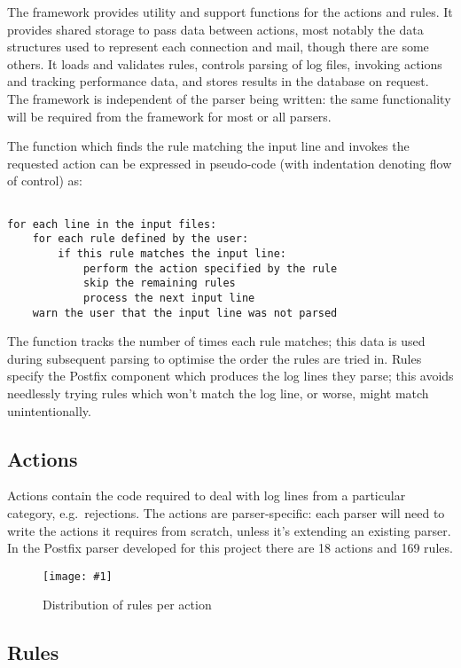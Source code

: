\documentclass[]{svmult}
\newcommand{\showgraph}[3]{
    \begin{figure}[hbt!]
        \caption{#2}\label{#3}
        \texttt{[image: \#1]}
    \end{figure}
}
\newcommand{\numberOFrules}[0]{%
    169%
}
\newcommand{\numberOFactions}[0]{%
    18%
}
\begin{document}
The framework provides utility and support functions for the actions and
rules.  It provides shared storage to pass data between actions, most
notably the data structures used to represent each connection and mail,
though there are some others.  It loads and validates rules, controls
parsing of log files, invoking actions and tracking performance data, and
stores results in the database on request.  The framework is independent of
the parser being written: the same functionality will be required from the
framework for most or all parsers.

The function which finds the rule matching the input line and invokes the
requested action can be expressed in pseudo-code (with indentation denoting
flow of control) as:

\begin{verbatim}

for each line in the input files:
    for each rule defined by the user:
        if this rule matches the input line:
            perform the action specified by the rule
            skip the remaining rules
            process the next input line
    warn the user that the input line was not parsed

\end{verbatim}

The function tracks the number of times each rule matches; this data is
used during subsequent parsing to optimise the order the rules are tried
in.  Rules specify the Postfix component which produces the log lines they
parse; this avoids needlessly trying rules which won't match the log line,
or worse, might match unintentionally.

\subsection{Actions}

\label{Actions}

Actions contain the code required to deal with log lines from a particular
category, e.g.\ rejections.  The actions are parser-specific: each parser
will need to write the actions it requires from scratch, unless it's
extending an existing parser.  In the Postfix parser developed for this
project there are \numberOFactions{} actions and \numberOFrules{} rules.

\showgraph{build/plot-action-distribution}{Distribution of rules
per action}{Distribution of rules per action}

\subsection{Rules}
\end{document}
